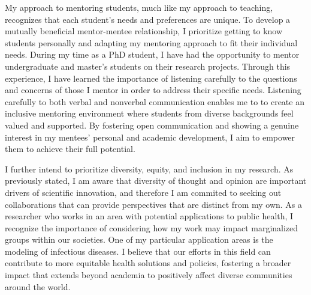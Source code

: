 \documentclass[11pt]{article}
\begin{document}
My approach to mentoring students, much like my approach to teaching, recognizes that each student’s needs and preferences are unique.
To develop a mutually beneficial mentor-mentee relationship, I prioritize getting to know students personally and adapting my mentoring approach to fit their individual needs.
During my time as a PhD student, I have had the opportunity to mentor undergraduate and master's students on their research projects.
Through this experience, I have learned the importance of listening carefully to the questions and concerns of those I mentor in order to address their specific needs.
Listening carefully to both verbal and nonverbal communication enables me to to create an inclusive mentoring environment where students from diverse backgrounds feel valued and supported.
By fostering open communication and showing a genuine interest in my mentees' personal and academic development, I aim to empower them to achieve their full potential.

I further intend to prioritize diversity, equity, and inclusion in my research.
As previously stated, I am aware that diversity of thought and opinion are important drivers of scientific innovation, and therefore I am commited to seeking out collaborations that can provide perspectives that are distinct from my own.
As a researcher who works in an area with potential applications to public health, I recognize the importance of considering how my work may impact marginalized groups within our societies.
One of my particular application areas is the modeling of infectious diseases.
I believe that our efforts in this field can contribute to more equitable health solutions and policies, fostering a broader impact that extends beyond academia to positively affect diverse communities around the world.


\end{document}
